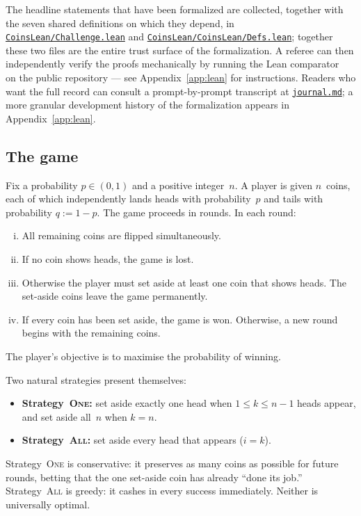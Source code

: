 \documentclass[12pt]{article}
\theoremstyle{definition}
\theoremstyle{remark}
\newcommand{\One}{\textsc{One}}
\newcommand{\All}{\textsc{All}}
\begin{document}
The headline statements that have been formalized are collected,
together with the seven shared definitions on which they depend, in
\href{https://github.com/pfaffelh/coins/blob/main/CoinsLean/Challenge.lean}{\texttt{CoinsLean/\allowbreak Challenge.lean}}
and
\href{https://github.com/pfaffelh/coins/blob/main/CoinsLean/CoinsLean/Defs.lean}{\texttt{CoinsLean/\allowbreak CoinsLean/\allowbreak Defs.lean}};
together these two files are the entire trust surface of the
formalization.  A referee can then independently verify the proofs
mechanically by running the Lean comparator~\cite{LeanComparator}
on the public repository --- see Appendix~\ref{app:lean} for
instructions.  Readers who want the full record can consult a
prompt-by-prompt transcript at
\href{https://github.com/pfaffelh/coins/blob/main/journal.md}{\texttt{journal.md}};
a more granular development history of the formalization appears
in Appendix~\ref{app:lean}.

\subsection{The game}

Fix a probability $p\in(0,1)$ and a positive integer~$n$.  A player
is given $n$~coins, each of which independently lands heads with
probability~$p$ and tails with probability $q:=1-p$.  The game
proceeds in rounds.  In each round:
\begin{enumerate}[(i)]
\item All remaining coins are flipped simultaneously.
\item If no coin shows heads, the game is lost.
\item Otherwise the player must set aside at least one coin that
  shows heads.  The set-aside coins leave the game permanently.
\item If every coin has been set aside, the game is won.
  Otherwise, a new round begins with the remaining coins.
\end{enumerate}
The player's objective is to maximise the probability of winning.

Two natural strategies present themselves:
\begin{itemize}
\item \textbf{Strategy~\One:} set aside exactly one head when
  $1\le k\le n-1$ heads appear, and set aside all~$n$ when $k=n$.
\item \textbf{Strategy~\All:} set aside every head that appears
  ($i=k$).
\end{itemize}
Strategy~\One{} is conservative: it preserves as many coins as
possible for future rounds, betting that the one set-aside coin has
already ``done its job.''  Strategy~\All{} is greedy: it cashes in
every success immediately.  Neither is universally optimal.
\end{document}
